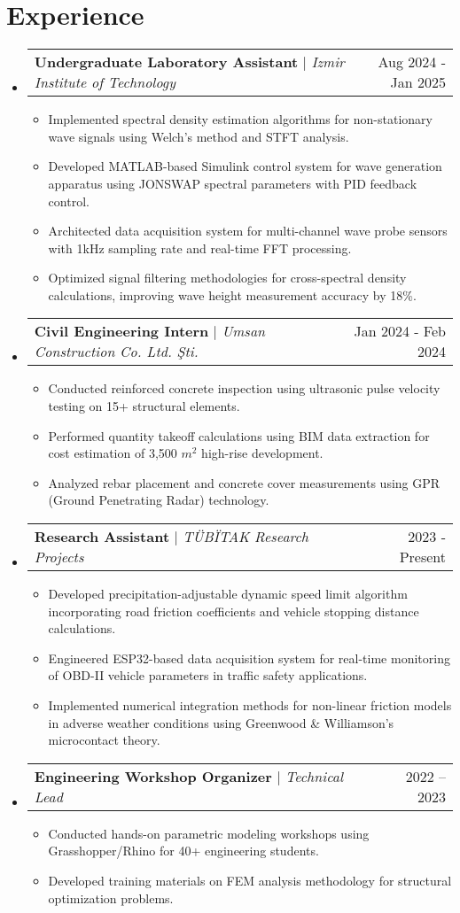 \documentclass[letterpaper,11pt]{article}
\makeatletter
\newcommand{\resumeItem}[1]{\item\small{{#1 \vspace{-2pt}}}}
\newcommand{\resumeProjectHeading}[2]{\item\begin{tabular*}{0.97\textwidth}{l@{\extracolsep{\fill}}r}\small#1 & #2 \\
\end{tabular*}\vspace{-7pt}}
\newcommand{\resumeSubHeadingListStart}{\begin{itemize}[leftmargin=0.15in, label={}]}
\newcommand{\resumeSubHeadingListEnd}{\end{itemize}}
\newcommand{\resumeItemListStart}{\begin{itemize}}
\newcommand{\resumeItemListEnd}{\end{itemize}\vspace{-5pt}}
\makeatother
\begin{document}
\section{Experience}
  \resumeSubHeadingListStart
        \resumeProjectHeading{\textbf{Undergraduate Laboratory Assistant} $|$ \emph{Izmir Institute of Technology}}{Aug 2024 - Jan 2025}
          \resumeItemListStart
            \resumeItem{Implemented spectral density estimation algorithms for non-stationary wave signals using Welch's method and STFT analysis.}
            \resumeItem{Developed MATLAB-based Simulink control system for wave generation apparatus using JONSWAP spectral parameters with PID feedback control.}
            \resumeItem{Architected data acquisition system for multi-channel wave probe sensors with 1kHz sampling rate and real-time FFT processing.}
            \resumeItem{Optimized signal filtering methodologies for cross-spectral density calculations, improving wave height measurement accuracy by 18\%.}
          \resumeItemListEnd
        \resumeProjectHeading{\textbf{Civil Engineering Intern} $|$ \emph{Umsan Construction Co. Ltd. \c{S}ti.}}{Jan 2024 - Feb 2024}
          \resumeItemListStart
            \resumeItem{Conducted reinforced concrete inspection using ultrasonic pulse velocity testing on 15+ structural elements.}
            \resumeItem{Performed quantity takeoff calculations using BIM data extraction for cost estimation of 3,500 $m^2$ high-rise development.}
            \resumeItem{Analyzed rebar placement and concrete cover measurements using GPR (Ground Penetrating Radar) technology.}
          \resumeItemListEnd
        \resumeProjectHeading{\textbf{Research Assistant} $|$ \emph{T\"UB\"ITAK Research Projects}}{2023 - Present}
          \resumeItemListStart
            \resumeItem{Developed precipitation-adjustable dynamic speed limit algorithm incorporating road friction coefficients and vehicle stopping distance calculations.}
            \resumeItem{Engineered ESP32-based data acquisition system for real-time monitoring of OBD-II vehicle parameters in traffic safety applications.}
            \resumeItem{Implemented numerical integration methods for non-linear friction models in adverse weather conditions using Greenwood \& Williamson's microcontact theory.}
          \resumeItemListEnd
        \resumeProjectHeading{\textbf{Engineering Workshop Organizer} $|$ \footnotesize\emph{Technical Lead}}{2022 -- 2023}
          \resumeItemListStart
            \resumeItem{Conducted hands-on parametric modeling workshops using Grasshopper/Rhino for 40+ engineering students.}
            \resumeItem{Developed training materials on FEM analysis methodology for structural optimization problems.}
          \resumeItemListEnd
  \resumeSubHeadingListEnd
\end{document}
